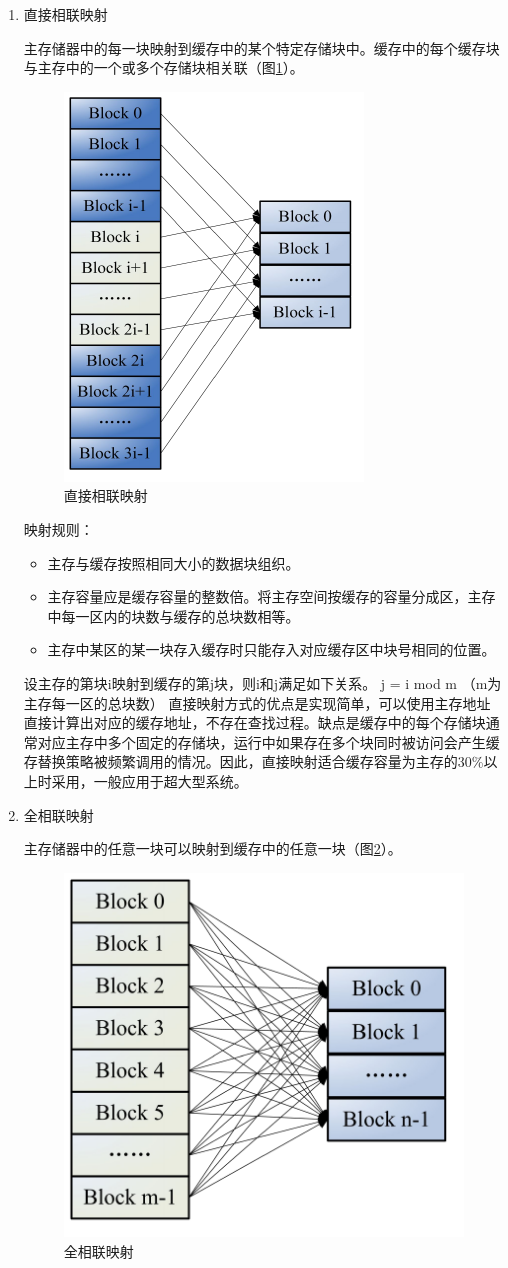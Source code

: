 \begin{enumerate}

\item 直接相联映射

主存储器中的每一块映射到缓存中的某个特定存储块中。缓存中的每个缓存块与主存中的一个或多个存储块相关联（图\ref{fig:cache-map-1}）。

\begin{figure}[H]
\centering
\includegraphics[width=0.3\linewidth]{./graph/cache-map-1}
\caption{直接相联映射}
\label{fig:cache-map-1}
\end{figure}

映射规则：
\begin{itemize}
\item 主存与缓存按照相同大小的数据块组织。
\item 主存容量应是缓存容量的整数倍。将主存空间按缓存的容量分成区，主存中每一区内的块数与缓存的总块数相等。 
\item 主存中某区的某一块存入缓存时只能存入对应缓存区中块号相同的位置。
\end{itemize}

设主存的第块i映射到缓存的第j块，则i和j满足如下关系。
j = i mod m	（m为主存每一区的总块数）
直接映射方式的优点是实现简单，可以使用主存地址直接计算出对应的缓存地址，不存在查找过程。缺点是缓存中的每个存储块通常对应主存中多个固定的存储块，运行中如果存在多个块同时被访问会产生缓存替换策略被频繁调用的情况。因此，直接映射适合缓存容量为主存的30\%以上时采用，一般应用于超大型系统。

\item 全相联映射

主存储器中的任意一块可以映射到缓存中的任意一块（图\ref{fig:cache-map-2}）。

\begin{figure}[H]
\centering
\includegraphics[width=0.3\linewidth]{./graph/cache-map-2}
\caption{全相联映射}
\label{fig:cache-map-2}
\end{figure}


\end{enumerate}
